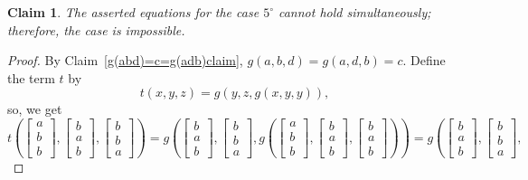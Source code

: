 \documentclass[11pt]{amsart}
\theoremstyle{definition}
\theoremstyle{remark}
\theoremstyle{plain}
\newtheorem{claim}[thm]{Claim}
\begin{document}
\begin{enumerate}[wide, labelindent=0pt]
\begin{enumerate}[wide, labelindent=0pt]
\begin{claim}
The asserted equations for the case $5^{\circ}$ cannot hold simultaneously; therefore, the case is impossible.
\end{claim}

\begin{proof}
By Claim~\ref{g(abd)=c=g(adb)claim}, $g(a,b,d) = g(a,d,b) = c$. Define the term $t$ by $$t(x,y,z)=g(y,z,g(x,y,y)),$$ so, we get 
 \begin{equation*}
t\left(
\begin{bmatrix}
a \\
b \\
b
\end{bmatrix}\!,\!
\begin{bmatrix}
b \\
a \\
b
\end{bmatrix}\!,\!
\begin{bmatrix}
b \\
b \\
a
\end{bmatrix}
\right)=
g\left(
\begin{bmatrix}
b \\
a \\
b
\end{bmatrix}\!,\!
\begin{bmatrix}
b \\
b \\
a
\end{bmatrix}\!,\!
g\left(
\begin{bmatrix}
a \\
b \\
b
\end{bmatrix}\!,\!
\begin{bmatrix}
b \\
a \\
b
\end{bmatrix}\!,\!
\begin{bmatrix}
b \\
a \\
b
\end{bmatrix}
\right)
\right)=
g\left(
\begin{bmatrix}
b \\
a \\
b
\end{bmatrix}\!,\!
\begin{bmatrix}
b \\
b \\
a
\end{bmatrix}\!,\!

\end{equation*}
\end{proof}
\end{enumerate}
\end{enumerate}
\end{document}
